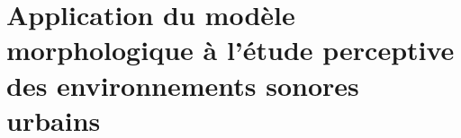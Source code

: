 \chapter{Application du modèle morphologique à l’étude perceptive des environnements sonores urbains}\label{ch:psycho_xp}






